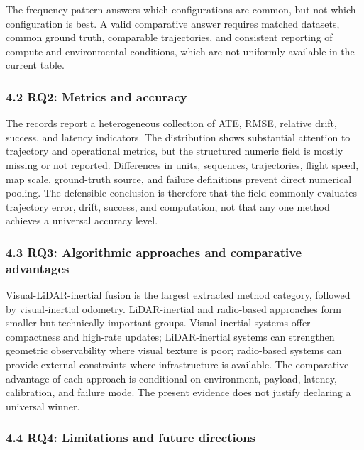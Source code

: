 \documentclass[
  journal]{IEEEtran}
\begin{document}
The frequency pattern answers which configurations are common, but not
which configuration is best. A valid comparative answer requires matched
datasets, common ground truth, comparable trajectories, and consistent
reporting of compute and environmental conditions, which are not
uniformly available in the current table.

\subsubsection{4.2 RQ2: Metrics and
accuracy}\label{42-rq2-metrics-and-accuracy}

The records report a heterogeneous collection of ATE, RMSE, relative
drift, success, and latency indicators. The distribution shows
substantial attention to trajectory and operational metrics, but the
structured numeric field is mostly missing or not reported. Differences
in units, sequences, trajectories, flight speed, map scale, ground-truth
source, and failure definitions prevent direct numerical pooling. The
defensible conclusion is therefore that the field commonly evaluates
trajectory error, drift, success, and computation, not that any one
method achieves a universal accuracy level.

\subsubsection{4.3 RQ3: Algorithmic approaches and comparative
advantages}\label{43-rq3-algorithmic-approaches-and-comparative-advantages}

Visual-LiDAR-inertial fusion is the largest extracted method category,
followed by visual-inertial odometry. LiDAR-inertial and radio-based
approaches form smaller but technically important groups.
Visual-inertial systems offer compactness and high-rate updates;
LiDAR-inertial systems can strengthen geometric observability where
visual texture is poor; radio-based systems can provide external
constraints where infrastructure is available. The comparative advantage
of each approach is conditional on environment, payload, latency,
calibration, and failure mode. The present evidence does not justify
declaring a universal winner.

\subsubsection{4.4 RQ4: Limitations and future
directions}\label{44-rq4-limitations-and-future-directions}
\end{document}
